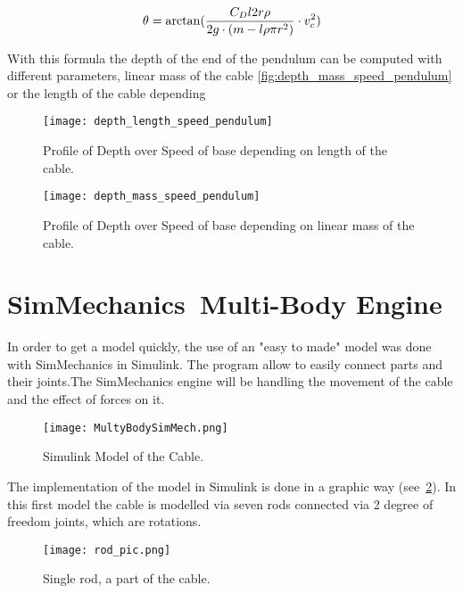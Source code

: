 \begin{equation}
 \theta = \arctan(\frac{C_D l 2 r \rho}{2 g \cdot (m - l \rho \pi r^2)} \cdot v_c^2)\\
 \label{equ_theta_1}
 \end{equation}
 
With this formula the depth of the end of the pendulum can be computed with different parameters, linear mass of the cable \ref{fig:depth_mass_speed_pendulum}  or the length of the cable depending 
 
 \begin{figure}[H]
\centering
    \begin{minipage}[b]{0.4\textwidth}
    \centering
    \texttt{[image: depth\_length\_speed\_pendulum]}
    \caption{Profile of Depth over Speed of base depending on length of the cable.}
    \label{fig:depth_mass_speed_pendulum}
    \end{minipage}
    \hfill
    \begin{minipage}[b]{0.4\textwidth}
    \centering
    \texttt{[image: depth\_mass\_speed\_pendulum]}
    \caption{Profile of Depth over Speed of base depending on linear mass of the cable.}
    \label{fig:depth_length_speed_pendulum}
    \end{minipage}
\end{figure}

 
 
\section{SimMechanics\texttrademark ~Multi-Body Engine}

In order to get a model quickly, the use of an "easy to made" model was done with SimMechanics in Simulink.
The program allow to easily connect parts and their joints.The SimMechanics engine will be handling the movement of the cable and the effect of forces on it.

\begin{figure}[H]
\centering
    \texttt{[image: MultyBodySimMech.png]}
    \caption{Simulink Model of the Cable.}
    \label{fig:SimulinkFullMod}
\end{figure}

The implementation of the model in Simulink is done in a graphic way (see~\ref{fig:SimulinkFullMod}). In
this first model the cable is modelled via seven rods connected via 2 degree of freedom joints, which are rotations.

\begin{figure}[H]
\centering
    \texttt{[image: rod\_pic.png]}
    \caption{Single rod, a part of the cable.}
    \label{fig:SingleRod}
\end{figure}

